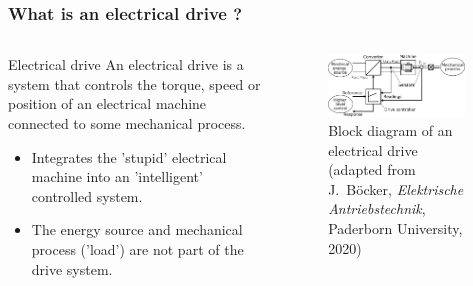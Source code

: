 \begin{frame}
	\frametitle{What is an electrical drive ?}
	\begin{columns}
		\begin{column}{0.4\textwidth}
			\begin{varblock}{Electrical drive}
			   An electrical drive is a system that controls the torque, speed or position of an electrical machine connected to some mechanical process.
			\end{varblock}
			\vspace{0.25cm}
			\begin{itemize}
				\item<2-> Integrates the 'stupid' electrical machine into an 'intelligent' controlled system.
				\item<3-> The energy source and mechanical process ('load') are not part of the drive system.
			\end{itemize}
		\end{column}
		\begin{column}{0.6\textwidth}
			\begin{figure}
				\centering
				\includegraphics[width=0.95\textwidth]{fig/lec01/Electrical_Drive_Block_Overview.pdf}
				\caption{Block diagram of an electrical drive (adapted from J.~B\"ocker, \textit{Elektrische Antriebstechnik}, Paderborn University, 2020)}
			\end{figure}
		\end{column}
	\end{columns}
\end{frame}


